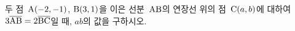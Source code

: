 두 점~$\mathrm{A}(-2{,}\mkern3mu\mathopen{}-1)$, $\mathrm{B}(3{,}\mkern3mu\mathopen{}1)$을 이은 선분~$\mathrm{AB}$의 연장선 위의 점~$\mathrm{C}(a{,}\mkern3mu\mathopen{}b)$에 대하여 $3\overline{\mathrm{AB}}=2\overline{\mathrm{BC}}$일 때, $ab$의 값을 구하시오. 

